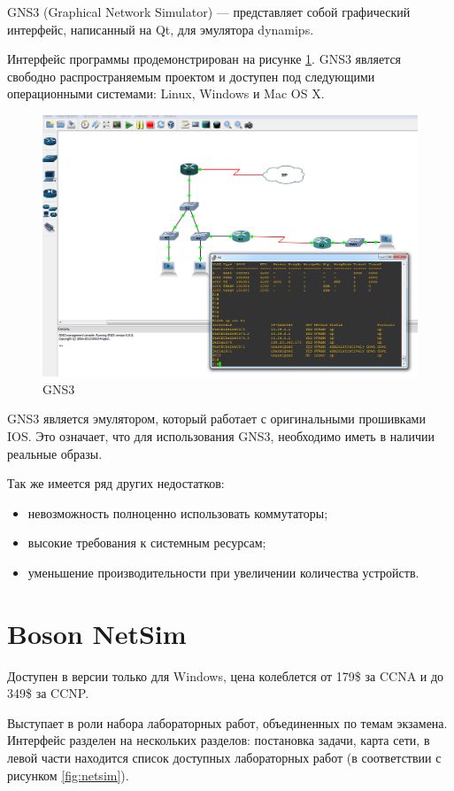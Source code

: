 	
	GNS3 (Graphical Network Simulator) --- представляет собой графический интерфейс, написанный на Qt, для эмулятора dynamips.
	
	Интерфейс программы продемонстрирован на рисунке \ref{fig:gns3}.
	GNS3 является свободно распространяемым проектом и доступен под следующими операционными системами: Linux, Windows и Mac OS X.
		
	\begin{figure}[h!]
		\centering
		\includegraphics[width=0.9\linewidth]{pic/gns3}
		\caption{GNS3}
		\label{fig:gns3}
	\end{figure}
	
	GNS3 является эмулятором, который работает с оригинальными прошивками IOS.
	Это означает, что для использования GNS3, необходимо иметь в наличии реальные образы.
	
	Так же имеется ряд других недостатков:
	\begin{itemize}
		\item невозможность полноценно использовать коммутаторы;
		\item высокие требования к системным ресурсам;
		\item уменьшение производительности при увеличении количества устройств.
	\end{itemize}
		
	\section{Boson NetSim}
	
	Доступен в версии только для Windows, цена колеблется от 179\$ за CCNA и до 349\$ за CCNP.
	
	Выступает в роли набора лабораторных работ, объединенных по темам экзамена. Интерфейс разделен на нескольких разделов: постановка задачи, карта сети, в
	левой части находится список доступных лабораторных работ (в соответствии с рисунком \ref{fig:netsim}).
	
